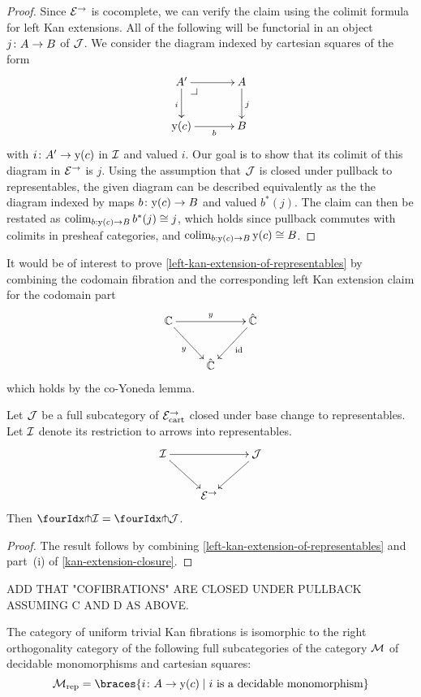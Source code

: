 \documentclass[reqno,10pt,a4paper,oneside,draft]{amsart}
\begin{document}
\begin{proof}
Since $\catE^\to$ is cocomplete, we can verify the claim using the colimit formula for left Kan extensions.
All of the following will be functorial in an object $j \co A \to B$ of $\cal{J}$.
We consider the diagram indexed by cartesian squares of the form
\[
\xymatrix@C=1.2cm{
  A'
  \ar[r]
  \ar[d]_{i}
  \pullback{dr}
&
  A
  \ar[d]^{j}
\\
  \yon(c)
  \ar[r]_-b
&
  B
}
\]
with $i \co A' \to \yon(c)$ in $\cal{I}$ and valued $i$.
Our goal is to show that its colimit of this diagram in $\catE^\to$ is $j$.
Using the assumption that $\cal{J}$ is closed under pullback to representables, the given diagram can be described equivalently as the the diagram indexed by maps $b \co \yon(c) \to B$ and valued $b^*(j)$.
The claim can then be restated as $\colim_{b : \yon(c) \to B} b^*(j) \iso j$, which holds since pullback commutes with colimits in presheaf categories, and $\colim_{b : \yon(c) \to B} \yon(c) \iso B$.
\end{proof}

\begin{remark}
It would be of interest to prove \cref{left-kan-extension-of-representables} by combining the codomain fibration and the corresponding left Kan extension claim for the codomain part
\[
\xymatrix{
  \cat{C}
  \ar[rr]^{y}
  \ar[dr]_{y}
&&
  \hat{\catC}
  \ar[dl]^{\id}
\\&
  \hat{\cat{C}}
}
\]
which holds by the co-Yoneda lemma.
\end{remark}

\begin{proposition} \label{awfs-on-arrows-into-representables}
Let $\cal{J}$ be a full subcategory of $\catE_{\cart}^\to$ closed under base change to representables.
Let $\cal{I}$ denote its restriction to arrows into representables.
\[
\xymatrix{
  \cal{I}
  \ar[rr]
  \ar[dr]
&&
  \cal{J}
  \ar[dl]
\\&
  \catE^\to
}
\]
Then $\liftr{\cal{I}} = \liftr{\cal{J}}$.
\end{proposition}

\begin{proof}
The result follows by combining \cref{left-kan-extension-of-representables} and part~(i) of \cref{kan-extension-closure}.
\end{proof}

ADD THAT "COFIBRATIONS" ARE CLOSED UNDER PULLBACK ASSUMING C AND D AS ABOVE.

\begin{lemma} \label{small-gen-triv-kan}
The category of uniform trivial Kan fibrations is isomorphic to the right orthogonality category of the following full subcategories of the category $\cal{M}$ of decidable monomorphisms and cartesian squares:
\[
  \cal{M}_{\textup{rep}} = \braces{i \co A \rightarrow \yon(c) \mid i \text{ is a decidable monomorphism} }
\]
\end{lemma}
\end{document}
